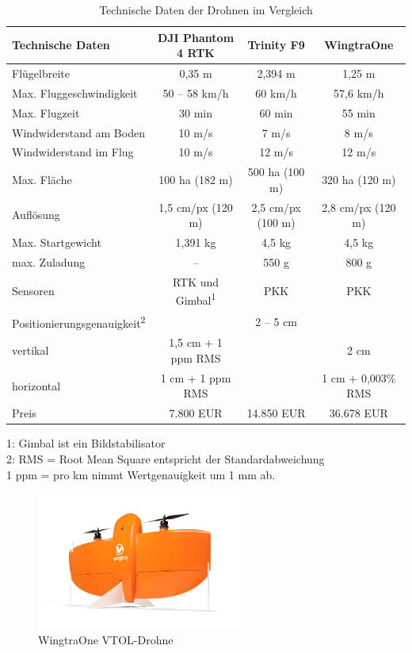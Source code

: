 \begin{table}[htbp]
\selectfont
\small
\begin{tabular}{lccc} %
\textbf{Technische Daten} & \textbf{DJI Phantom 4 RTK} & \textbf{Trinity F9}  & \textbf{WingtraOne} \\ %
\hline\hline
Flügelbreite & 0,35 m & 2,394 m & 1,25 m \\
Max. Fluggeschwindigkeit & 50 – 58 km/h & 60 km/h & 57,6 km/h \\
Max. Flugzeit & 30 min & 60 min & 55 min \\
Windwiderstand am Boden & 10 m/s & 7 m/s & 8 m/s \\
Windwiderstand im Flug & 10 m/s & 12 m/s & 12 m/s \\
Max. Fläche & 100 ha (182 m) & 500 ha (100 m) & 320 ha (120 m) \\
Auflösung & 1,5 cm/px (120 m) & 2,5 cm/px (100 m) & 2,8 cm/px (120 m) \\
Max. Startgewicht & 1,391 kg & 4,5 kg & 4,5 kg \\
max. Zuladung & – & 550 g & 800 g \\
Sensoren & RTK und Gimbal\textsuperscript{1} & PKK & PKK \\
Positionierungsgenauigkeit\textsuperscript{2} &  & 2 – 5 cm &  \\
{    } vertikal & 1,5 cm + 1 ppm RMS &  & 2 cm  \\
{    } horizontal & 1 cm + 1 ppm RMS &  & 1 cm + 0,003\% RMS\\
Preis & 7.800 EUR & 14.850 EUR & 36.678 EUR\\
\hline
\end{tabular}
\scriptsize
1: Gimbal ist ein Bildstabilisator \\
2: RMS = Root Mean Square entspricht der Standardabweichung \\
1 ppm = pro km nimmt Wertgenauigkeit um 1 mm ab. 
\caption[Tabelle]{Technische Daten der Drohnen im Vergleich}
\label{tab:technischedaten}
\end{table}



\begin{figure}[htb]
 \centering
  \includegraphics[width=0.6\textwidth,angle=0]{abb/drohnen/wingtraone}
 \caption{WingtraOne VTOL-Drohne}
\label{fig:wingtraone}
\end{figure}

